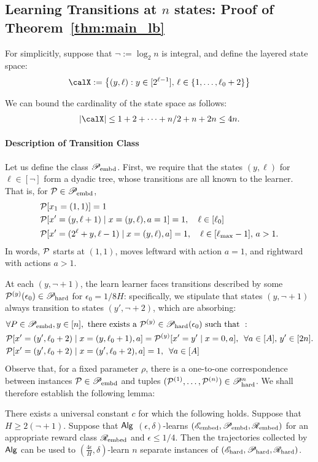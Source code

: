 \subsection{Learning Transitions at $n$ states: Proof of Theorem~\ref{thm:main_lb}}


For simplicitly, suppose that $\lnot:= \log_2 n$ is integral, and define the layered state space:
\begin{align*}
\calX := \left\{(y,\ell): y \in [2^{\ell- 1}], \,\ell \in \{1,\dots,\lnot+2\} \right\} 
\end{align*}

We can bound the cardinality of the state space as follows:
\begin{align*}
|\calX| \le 1 + 2+ \dots + n/2 + n +  2n \le 4n.
\end{align*}

\paragraph{Description of Transition Class }
Let us define the class $\mathscr{P}_{\mathrm{embd}}$. 
First, we require that the states $(y,\ell)$ for $\ell \in [\lnot]$ form a dyadic tree, whose transitions are all known to the learner. That is, for $\mathcal{P} \in \mathscr{P}_{\mathrm{embd}}$,
\begin{align*}
&\mathcal{P}[x_1 = (1,1)] = 1\\
&\mathcal{P}[x' = (y,\ell+1) \mid x = (y,\ell), a = 1] = 1, \quad \ell \in [ \ell_0 ]\\
&\mathcal{P}[x' = (2^{\ell} + y,\ell- 1) \mid x = (y,\ell), a] = 1, \quad \ell \in [\ell_{\max} - 1], \,a > 1.
\end{align*}
In words, $\mathcal{P}$ starts at $(1,1)$, moves leftward with action $a = 1$, and rightward with actions $a > 1$. 

At each $(y,\lnot+1)$, the learn learner faces transitions described by some $\mathcal{P}^{(y)}(\epsilon_0) \in \mathscr{P}_{\mathrm{hard}}$ for $\epsilon_0= 1/8H$: specifically, we stipulate that states $(y,\lnot+1)$ always transition to states $(y',\lnot+2)$, which are absorbing:
\begin{align*}
&\forall P \in \mathscr{P}_{\mathrm{embd}}, y \in [n], \text{ there exists a } \mathcal{P}^{(y)} \in \mathscr{P}_{\mathrm{hard}}(\epsilon_0) \text{ such that }:\\
&\mathcal{P}[x' = (y',\ell_0+2) \mid x = (y,\ell_0+1), a] = \mathcal{P}^{(y)}[x' = y' \mid x = 0, a], \,\,\,\forall a \in [A], \,y' \in [2n].\\
&\mathcal{P}[x' = (y',\ell_0+2) \mid x = (y',\ell_0+2), a] =1, \,\,\, \forall a \in [A]
\end{align*}
Observe that, for a fixed parameter $\rho$, there is a one-to-one correspondence between instances $\mathcal{P} \in \mathscr{P}_{\mathrm{embd}}$ and tuples $(\mathcal{P}^{(1)},\dots,\mathcal{P}^{(n)}) \in \mathscr{P}_{\mathrm{hard}}^n$. We shall therefore establish the following lemma:
\begin{lemma}\label{lem:separate_lemma} There exists a universal constant $c$ for which the following holds. Suppose that $H \ge 2(\lnot + 1)$.  Suppose that $\mathsf{Alg}$ $(\epsilon,\delta)$-learns $(\mathscr{E}_{\mathrm{embed}},\mathscr{P}_{\mathrm{embd}},\mathscr{R}_{\mathrm{embed}})$ for an appropriate reward class $\mathscr{R}_{\mathrm{embed}}$ and $\epsilon \le 1/4$. Then the trajectories collected by $\mathsf{Alg}$ can be used to $(\frac{4\epsilon}{H},\delta)$-learn $n$ separate instances of $(\mathscr{E}_{\mathrm{hard}},\mathscr{P}_{\mathrm{hard}},\mathscr{R}_{\mathrm{hard}})$.
\end{lemma}

